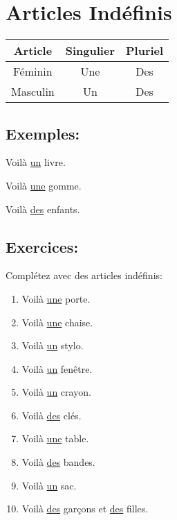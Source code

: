 \section{Articles Indéfinis}

\begin{center}
    \begin{tabular}{|c|c|c|}
        \hline
        Article & Singulier & Pluriel \\
        \hline
        Féminin & Une & Des \\
        \hline
        Masculin & Un & Des \\
        \hline
    \end{tabular}
\end{center}

\subsection{Exemples:}

Voilà \underline{un} livre.

Voilà \underline{une} gomme.

Voilà \underline{des} enfants.

\subsection{Exercices:}

Complétez avec des articles indéfinis:

\begin{enumerate}
    \item Voilà \underline{une} porte.
    \item Voilà \underline{une} chaise.
    \item Voilà \underline{un} stylo.
    \item Voilà \underline{un} fenêtre.
    \item Voilà \underline{un} crayon.
    \item Voilà \underline{des} clés.
    \item Voilà \underline{une} table.
    \item Voilà \underline{des} bandes.
    \item Voilà \underline{un} sac.
    \item Voilà \underline{des} garçons et \underline{des} filles.
\end{enumerate}